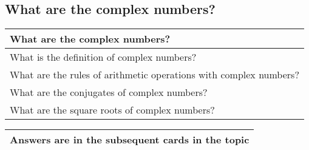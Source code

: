 \subsection{What are the complex numbers?}
\begin{small}
    \begin{tabularx}{1\textwidth}{
            p{}
        }
        \toprule
        \textbf{What are the complex numbers?}
        \\
        \midrule

        What is the definition of complex numbers?
        \\
        \midrule

        What are the rules of arithmetic operations with complex numbers?
        \\
        \midrule

        What are the conjugates of complex numbers?
        \\
        \midrule

        What are the square roots of complex numbers?
        \\
        \bottomrule
    \end{tabularx}
\end{small}
\begin{small}
    \begin{tabularx}{1\textwidth}{
            p{}
        }
        \toprule
        Answers are in the subsequent cards in the topic
        \\
        \bottomrule

    \end{tabularx}
\end{small}
